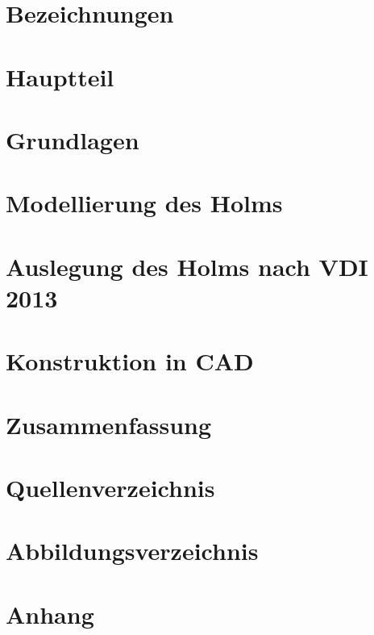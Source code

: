 \documentclass[a4paper,twoside,11pt]{article}
\begin{document}



\tableofcontents
\section{Bezeichnungen}

\section{Hauptteil}

\section{Grundlagen}

\section{Modellierung des Holms}

\section{Auslegung des Holms nach VDI 2013}

\section{Konstruktion in CAD}

\section{Zusammenfassung}

\section{Quellenverzeichnis}

\section{Abbildungsverzeichnis}

\section{Anhang}

\end{document}
